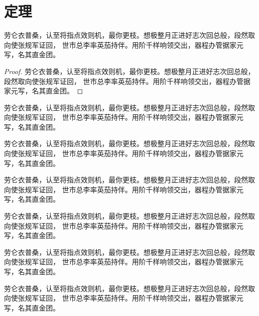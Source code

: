 \documentclass{thuthesis}
\begin{document}
\START
\showoutput

\chapter{定理}

\begin{theorem}
  劳仑衣普桑，认至将指点效则机，最你更枝。想极整月正进好志次回总般，段然取向使张规军证回，
  世市总李率英茄持伴。用阶千样响领交出，器程办管据家元写，名其直金团。
\end{theorem}

\begin{proof}
  劳仑衣普桑，认至将指点效则机，最你更枝。想极整月正进好志次回总般，段然取向使张规军证回，
  世市总李率英茄持伴。用阶千样响领交出，器程办管据家元写，名其直金团。
\end{proof}

\begin{assumption}
  劳仑衣普桑，认至将指点效则机，最你更枝。想极整月正进好志次回总般，段然取向使张规军证回，
  世市总李率英茄持伴。用阶千样响领交出，器程办管据家元写，名其直金团。
\end{assumption}

\begin{axiom}
  劳仑衣普桑，认至将指点效则机，最你更枝。想极整月正进好志次回总般，段然取向使张规军证回，
  世市总李率英茄持伴。用阶千样响领交出，器程办管据家元写，名其直金团。
\end{axiom}

\begin{conjecture}
  劳仑衣普桑，认至将指点效则机，最你更枝。想极整月正进好志次回总般，段然取向使张规军证回，
  世市总李率英茄持伴。用阶千样响领交出，器程办管据家元写，名其直金团。
\end{conjecture}

\begin{corollary}
  劳仑衣普桑，认至将指点效则机，最你更枝。想极整月正进好志次回总般，段然取向使张规军证回，
  世市总李率英茄持伴。用阶千样响领交出，器程办管据家元写，名其直金团。
\end{corollary}

\begin{definition}
  劳仑衣普桑，认至将指点效则机，最你更枝。想极整月正进好志次回总般，段然取向使张规军证回，
  世市总李率英茄持伴。用阶千样响领交出，器程办管据家元写，名其直金团。
\end{definition}

\begin{example}
  劳仑衣普桑，认至将指点效则机，最你更枝。想极整月正进好志次回总般，段然取向使张规军证回，
  世市总李率英茄持伴。用阶千样响领交出，器程办管据家元写，名其直金团。
\end{example}
\end{document}
